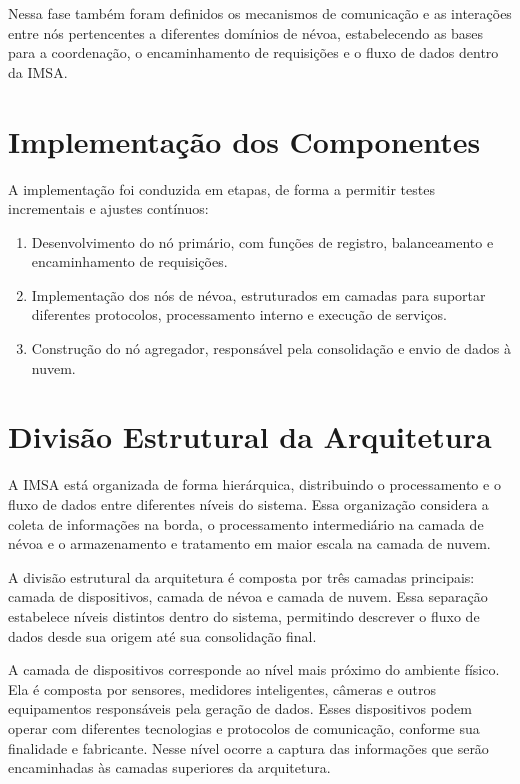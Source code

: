 Nessa fase também foram definidos os mecanismos de comunicação e as interações entre nós pertencentes a diferentes domínios de névoa, estabelecendo as bases para a coordenação, o encaminhamento de requisições e o fluxo de dados dentro da \gls{IMSA}.

\section{Implementação dos Componentes}

A implementação foi conduzida em etapas, de forma a permitir testes incrementais e ajustes contínuos:
\begin{enumerate}
    \item Desenvolvimento do nó primário, com funções de registro, balanceamento e encaminhamento de requisições.
    \item Implementação dos nós de névoa, estruturados em camadas para suportar diferentes protocolos, processamento interno e execução de serviços.
    \item Construção do nó agregador, responsável pela consolidação e envio de dados à nuvem.
\end{enumerate}

\section{Divisão Estrutural da Arquitetura}

A \gls{IMSA} está organizada de forma hierárquica,
distribuindo o processamento e o fluxo de dados entre diferentes
níveis do sistema. Essa organização considera a coleta de informações
na borda, o processamento intermediário na camada de névoa e o
armazenamento e tratamento em maior escala na camada de nuvem.

A divisão estrutural da arquitetura é composta por três camadas
principais: camada de dispositivos, camada de névoa e camada de
nuvem. Essa separação estabelece níveis distintos dentro do sistema,
permitindo descrever o fluxo de dados desde sua origem até sua
consolidação final.

A camada de dispositivos corresponde ao nível mais próximo do
ambiente físico. Ela é composta por sensores, medidores inteligentes,
câmeras e outros equipamentos responsáveis pela geração de dados.
Esses dispositivos podem operar com diferentes tecnologias e
protocolos de comunicação, conforme sua finalidade e fabricante.
Nesse nível ocorre a captura das informações que serão encaminhadas
às camadas superiores da arquitetura.

